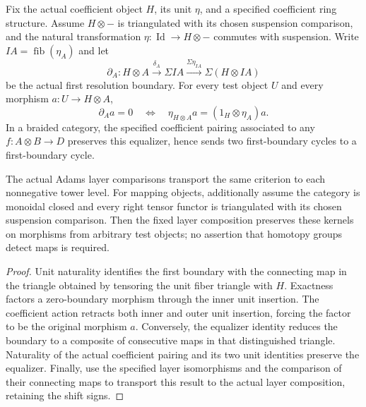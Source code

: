 \begin{proposition}
  \label{prop:moss-first-boundary-unit-equalizer}
  \leanok
  Fix the actual coefficient object $H$, its unit $\eta$, and a specified
  coefficient ring structure.  Assume $H\otimes-$ is triangulated with
  its chosen suspension comparison, and the natural transformation
  $\eta:\operatorname{Id}\to H\otimes-$ commutes with suspension.
  Write $I A=\operatorname{fib}(\eta_A)$ and let
  \[
    \partial_A:H\otimes A\xrightarrow{\delta_A}\Sigma I A
      \xrightarrow{\Sigma\eta_{IA}}\Sigma(H\otimes I A)
  \]
  be the actual first resolution boundary.  For every test object $U$ and
  every morphism $a:U\to H\otimes A$,
  \[
    \partial_A a=0\quad\Longleftrightarrow\quad
    \eta_{H\otimes A}a=(1_H\otimes\eta_A)a.
  \]
  In a braided category, the specified coefficient pairing associated to
  any $f:A\otimes B\to D$ preserves this equalizer, hence sends two
  first-boundary cycles to a first-boundary cycle.

  The actual Adams layer comparisons transport the same criterion to
  each nonnegative tower level.  For mapping objects, additionally assume
  the category is monoidal closed and every right tensor functor is
  triangulated with its chosen suspension comparison.  Then the fixed
  layer composition preserves these kernels on morphisms from arbitrary
  test objects; no assertion that homotopy groups detect maps is required.
\end{proposition}
\begin{proof}
  \leanok
  Unit naturality identifies the first boundary with the connecting map
  in the triangle obtained by tensoring the unit fiber triangle with $H$.
  Exactness factors a zero-boundary morphism through the inner unit
  insertion.  The coefficient action retracts both inner and outer unit
  insertion, forcing the factor to be the original morphism $a$.
  Conversely, the equalizer identity reduces the boundary to a composite
  of consecutive maps in that distinguished triangle.
  Naturality of the actual coefficient pairing and its two unit identities
  preserve the equalizer.  Finally, use the specified layer isomorphisms
  and the comparison of their connecting maps to transport this result
  to the actual layer composition, retaining the shift signs.
\end{proof}

